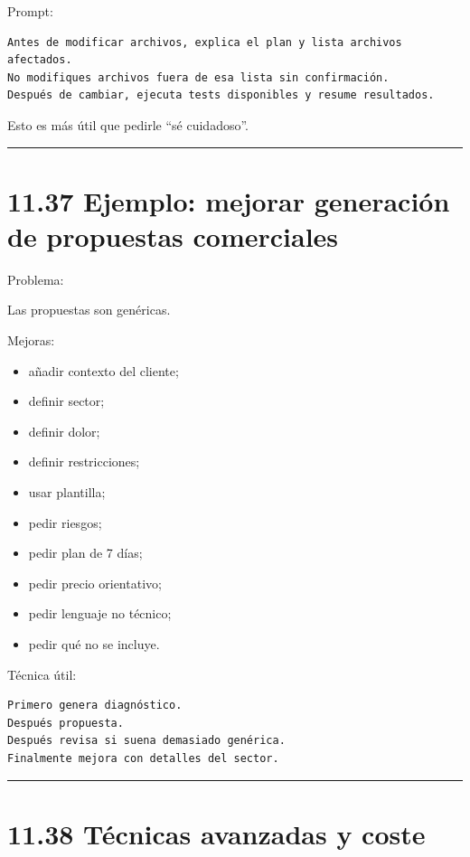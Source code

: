 Prompt:

\begin{lstlisting}
Antes de modificar archivos, explica el plan y lista archivos afectados.
No modifiques archivos fuera de esa lista sin confirmación.
Después de cambiar, ejecuta tests disponibles y resume resultados.
\end{lstlisting}

Esto es más útil que pedirle ``sé cuidadoso''.

\begin{center}\rule{0.5\linewidth}{0.5pt}\end{center}

\section{11.37 Ejemplo: mejorar generación de propuestas
comerciales}\label{ejemplo-mejorar-generaciuxf3n-de-propuestas-comerciales}

Problema:

Las propuestas son genéricas.

Mejoras:

\begin{itemize}
\tightlist
\item
  añadir contexto del cliente;
\item
  definir sector;
\item
  definir dolor;
\item
  definir restricciones;
\item
  usar plantilla;
\item
  pedir riesgos;
\item
  pedir plan de 7 días;
\item
  pedir precio orientativo;
\item
  pedir lenguaje no técnico;
\item
  pedir qué no se incluye.
\end{itemize}

Técnica útil:

\begin{lstlisting}
Primero genera diagnóstico.
Después propuesta.
Después revisa si suena demasiado genérica.
Finalmente mejora con detalles del sector.
\end{lstlisting}

\begin{center}\rule{0.5\linewidth}{0.5pt}\end{center}

\section{11.38 Técnicas avanzadas y
coste}\label{tuxe9cnicas-avanzadas-y-coste}

